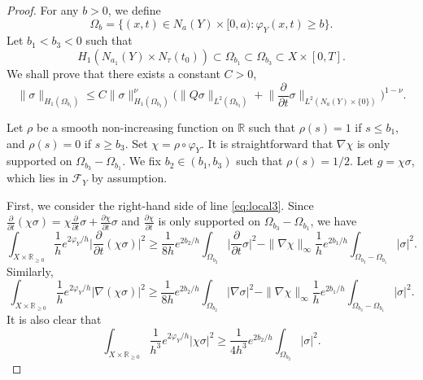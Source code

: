 \documentclass[12pt, reqno]{amsart}
\theoremstyle{plain}%
\theoremstyle{definition}
\theoremstyle{remark}
\numberwithin{equation}{section}
\newcommand{\R}{\mathbb{R}}
\begin{document}
\begin{proof}
	For any $b>0$, we define
	$$\Omega_b=\{(x,t)\in N_a(Y)\times[0,a):\varphi_Y(x,t)\geq b\}.$$ Let $b_1<b_3<0$ such that $$H_1(N_{a_1}(Y)\times N_\tau(t_0))\subset \Omega_{b_1}\subset \Omega_{b_3}\subset X\times[0,T].$$
	We shall prove that there exists a constant $C>0$,
		\begin{equation}
		\|\sigma\|_{H_1(\Omega_{b_1})}\leq C \|\sigma\|_{H_1(\Omega_{b_3})}^\nu\Big(\|Q\sigma\|_{L^2(\Omega_{b_3})}+\Big\|\frac{\partial}{\partial t}\sigma\Big\|_{L^2(N_a(Y)\times\{0\})}\Big)^{1-\nu}.
	\end{equation}
	
	Let $\rho$ be a smooth non-increasing function on $\R$ such that $\rho(s)=1$ if $s\leq b_1$, and $\rho(s)=0$ if $s\geq b_3$.
%	
	Set $\chi=\rho\circ\varphi_Y$. It is straightforward that $\nabla\chi$ is only supported on $\Omega_{b_3}-\Omega_{b_1}$. We fix $b_2\in({b_1},{b_3})$ such that $\rho(s)=1/2$. Let $g=\chi\sigma$, which lies in $\mathcal F_Y$ by assumption. 
	
	First, we consider the right-hand side of line \eqref{eq:local3}. Since $\frac{\partial}{\partial t}( \chi\sigma)=\chi\frac{\partial}{\partial t} \sigma+\frac{\partial\chi}{\partial t} \sigma$ and $\frac{\partial\chi}{\partial t}$ is only supported on $\Omega_{b_3}-\Omega_{b_1}$, we have
	\begin{equation*}
		\int_{X\times\R_{\geq 0}}\frac 1 he^{2\varphi_Y/h}\Big|\frac{\partial}{\partial t} (\chi\sigma)\Big|^2\geq \frac{1}{8h}e^{2b_2/h}\int_{\Omega_{b_2}}\Big|\frac{\partial}{\partial t} \sigma\Big|^2-\|\nabla\chi\|_\infty\frac 1 he^{2{b_1}/h}\int_{\Omega_{b_3}-\Omega_{b_1}}|\sigma|^2.
	\end{equation*}
	Similarly,
		\begin{equation*}
		\int_{X\times\R_{\geq 0}}\frac 1 he^{2\varphi_Y/h}|\nabla(\chi\sigma)|^2\geq \frac{1}{8h}e^{2b_2/h}\int_{\Omega_{b_2}}|\nabla \sigma|^2-\|\nabla\chi\|_\infty\frac 1 he^{2{b_1}/h}\int_{\Omega_{b_3}-\Omega_{b_1}}|\sigma|^2.
	\end{equation*}
	It is also clear that
	\begin{equation*}
		\int_{X\times\R_{\geq 0}}\frac{1}{h^3}e^{2\varphi_Y/h}|\chi\sigma|^2\geq \frac{1}{4h^3}e^{2b_2/h}\int_{\Omega_{b_2}}|\sigma|^2.
	\end{equation*}
	

\end{proof}
\end{document}
